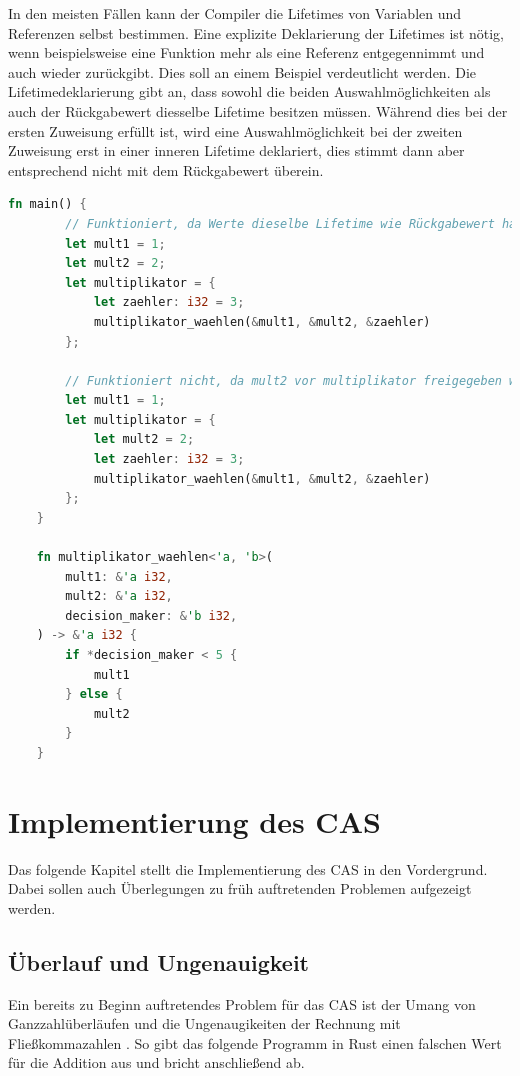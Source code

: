 \documentclass[11pt,a4paper, ngerman]{article}
\begin{document}
In den meisten Fällen kann der Compiler die Lifetimes von Variablen und Referenzen selbst bestimmen. Eine explizite Deklarierung der Lifetimes ist nötig, wenn beispielsweise eine Funktion mehr als eine Referenz entgegennimmt und auch wieder zurückgibt. Dies soll an einem Beispiel verdeutlicht werden. Die Lifetimedeklarierung  gibt an, dass sowohl die beiden Auswahlmöglichkeiten als auch der Rückgabewert diesselbe Lifetime besitzen müssen. Während dies bei der ersten Zuweisung erfüllt ist, wird eine Auswahlmöglichkeit bei der zweiten Zuweisung erst in einer inneren Lifetime deklariert, dies stimmt dann aber entsprechend nicht mit dem Rückgabewert überein.

\begin{lstlisting}[language=rust, caption={Lifetime Beispiele \cite{RustLifetimeEx}}]
    fn main() {
        // Funktioniert, da Werte dieselbe Lifetime wie Rückgabewert haben
        let mult1 = 1;
        let mult2 = 2;
        let multiplikator = {
            let zaehler: i32 = 3;
            multiplikator_waehlen(&mult1, &mult2, &zaehler)
        };

        // Funktioniert nicht, da mult2 vor multiplikator freigegeben wird
        let mult1 = 1;
        let multiplikator = {
            let mult2 = 2;
            let zaehler: i32 = 3;
            multiplikator_waehlen(&mult1, &mult2, &zaehler)
        };
    }

    fn multiplikator_waehlen<'a, 'b>(
        mult1: &'a i32,
        mult2: &'a i32,
        decision_maker: &'b i32,
    ) -> &'a i32 {
        if *decision_maker < 5 {
            mult1
        } else {
            mult2
        }
    }
\end{lstlisting}

\newpage

\section{Implementierung des CAS}
Das folgende Kapitel stellt die Implementierung des CAS in den Vordergrund. Dabei sollen auch Überlegungen zu früh auftretenden Problemen aufgezeigt werden.

\subsection{Überlauf und Ungenauigkeit}
Ein bereits zu Beginn auftretendes Problem für das CAS ist der Umang von Ganzzahlüberläufen und die Ungenaugikeiten der Rechnung mit Fließkommazahlen \cite{IEEE754}. So gibt das folgende Programm in Rust einen falschen Wert für die Addition aus und bricht anschließend ab.
\end{document}
